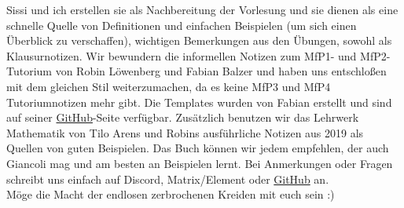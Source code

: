 Sissi und ich erstellen sie als Nachbereitung der Vorlesung und sie dienen als eine schnelle Quelle von Definitionen und einfachen Beispielen (um sich einen Überblick zu verschaffen), wichtigen Bemerkungen aus den Übungen, sowohl als Klausurnotizen. Wir bewundern die informellen Notizen zum MfP1- und MfP2-Tutorium von Robin Löwenberg und Fabian Balzer und haben uns entschloßen mit dem gleichen Stil weiterzumachen, da es keine MfP3 und MfP4 Tutoriumnotizen mehr gibt. Die Templates wurden von Fabian erstellt und sind auf seiner \href{https://github.com/Fabian-Balzer/MfP2-Notizen}{GitHub}-Seite verfügbar. Zusätzlich benutzen wir das Lehrwerk Mathematik von Tilo Arens und Robins ausführliche Notizen aus 2019 als Quellen von guten Beispielen. Das Buch können wir jedem empfehlen, der auch Giancoli mag und am besten an Beispielen lernt. Bei Anmerkungen oder Fragen schreibt uns einfach auf Discord, Matrix/Element oder \href{https://github.com/luxdragon/MfP3-Notizen}{GitHub} an. \\ 

Möge die Macht der endlosen zerbrochenen Kreiden mit euch sein :)

\cfoot{\pagemark}

